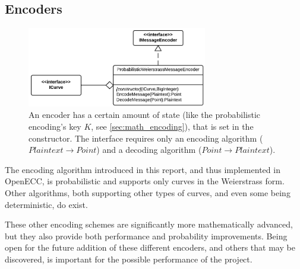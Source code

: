 \subsection{Encoders}
\label{sec:implementation_encoding}

\begin{figure}[htb]
	\centering
	\includegraphics[width=0.7\textwidth]{implementation/encoders}
	\caption{An encoder has a certain amount of state (like the probabilistic encoding's key \(K\), see \ref{sec:math_encoding}), that is
		set in the constructor. The interface requires only an encoding algorithm (\(Plaintext \to Point\)) and
		a decoding algorithm (\(Point \to Plaintext\)).}
\end{figure}

The encoding algorithm introduced in this report, and thus implemented in OpenECC, is probabilistic and supports
only curves in the Weierstrass form. Other algorithms, both supporting other types of curves, and even some being
deterministic, do exist.\cite{MappingAMessage}\cite{InjectiveEncodings}

These other encoding schemes are significantly more mathematically advanced, but they also provide both performance
and probability improvements. Being open for the future addition of these different encoders, and others that may be
discovered, is important for the possible performance of the project.